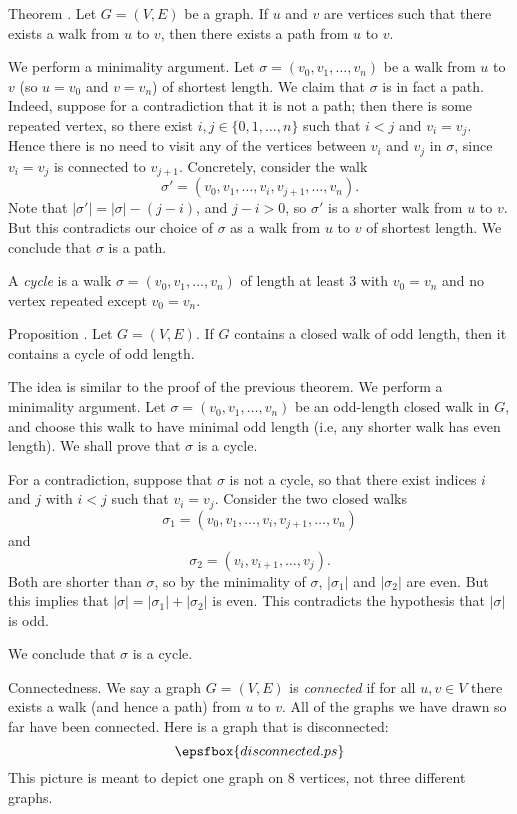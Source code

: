 \proclaim Theorem \advthm. Let $G = (V,E)$ be a graph. If $u$ and $v$ are vertices
such that there exists a walk from $u$ to $v$, then there exists a path from $u$ to $v$.

\proof We perform a minimality argument.
Let $\sigma = (v_0, v_1,\ldots, v_n)$ be a walk from $u$ to $v$ (so
$u = v_0$ and $v = v_n$) of shortest length. We claim that $\sigma$ is in fact a path.
Indeed, suppose for a contradiction that it is not a path; then there is some repeated vertex,
so there exist $i,j\in\{0,1,\ldots,n\}$ such that $i<j$ and $v_i = v_j$. Hence
there is no need to visit any of the vertices between $v_i$ and $v_j$ in $\sigma$,
since $v_i = v_j$ is connected to $v_{j+1}$. Concretely, consider the walk
$$\sigma' = (v_0, v_1,\ldots, v_i, v_{j+1}, \ldots, v_n).$$
Note that $|\sigma'| = |\sigma| - (j-i)$, and $j-i > 0$, so $\sigma'$ is a shorter walk
from $u$ to $v$. But this contradicts our choice of $\sigma$ as a walk from
$u$ to $v$ of shortest length. We conclude that $\sigma$ is a path.\slug

A {\it cycle} is a walk $\sigma = (v_0,v_1,\ldots,v_n)$ of length at least $3$
with $v_0 = v_n$ and no vertex repeated except $v_0 = v_n$.

\edef\propoddwalkoddcycle{\the\thmcount}
\proclaim Proposition \advthm. Let $G = (V,E)$. If $G$ contains a closed walk
of odd length, then it contains a cycle of odd length.

\proof The idea is similar to the proof of the previous theorem. We perform a
minimality argument. Let
$\sigma = (v_0, v_1,\ldots,v_n)$ be an odd-length closed walk in $G$, and choose
this walk to have minimal odd length (i.e, any shorter walk has even length). We shall
prove that $\sigma$ is a cycle.

For a contradiction, suppose that $\sigma$ is not a cycle, so that
there exist indices $i$ and $j$ with $i<j$ such that $v_i = v_j$.
Consider the two closed walks
$$\sigma_1 = (v_0, v_1, \ldots, v_i, v_{j+1}, \ldots, v_n)$$
and
$$\sigma_2 = (v_i, v_{i+1}, \ldots, v_j).$$
Both are shorter than $\sigma$, so by the minimality of $\sigma$,
$|\sigma_1|$ and $|\sigma_2|$ are even. But this implies that
$|\sigma| = |\sigma_1|+|\sigma_2|$ is even. This contradicts the hypothesis that $|\sigma|$
is odd.

We conclude that $\sigma$ is a cycle.\slug

\medskip\boldlabel{} Connectedness.
We say a graph $G = (V,E)$ is {\it connected} if for all $u,v\in V$ there exists
a walk (and hence a path) from $u$ to $v$. All of the graphs we have
drawn so far have been connected. Here is a graph that is disconnected:
\midinsert
$$\epsfbox{disconnected.ps}$$
\endinsert
\noindent This picture is meant to depict one graph on $8$ vertices, not three
different graphs.

